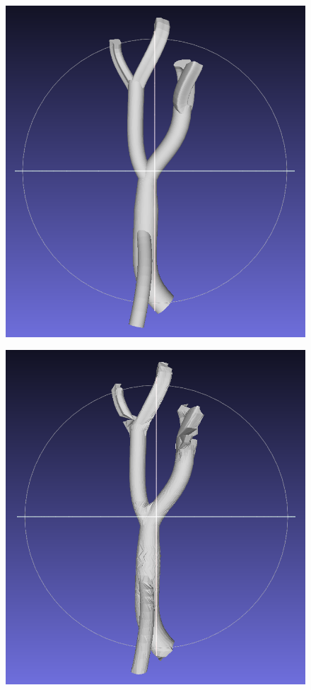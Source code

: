 \documentclass[11p, titlepage]{article}
\begin{document}
\begin{figure}[h]
     \centering
     \begin{minipage}[b]{.38\linewidth}
       {\includegraphics[width=\linewidth]{originals/multi-branch}}%
     \end{minipage}%
     \hfill
     \begin{minipage}[b]{.6\linewidth}
       {\includegraphics[width=.48\linewidth]{reconstructions/dtw-multi-branch-50}}%
       \hfill

\end{minipage}
\end{figure}
\end{document}
